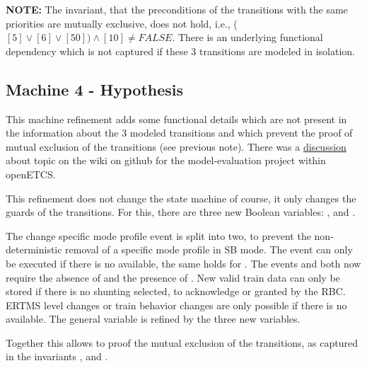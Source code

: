 \documentclass{template/openetcs_article}
\begin{document}
{\bf NOTE:} The invariant, that the preconditions of the transitions with the
same priorities are mutually exclusive, does not hold, i.e., ($[5] \vee [6] \vee
[50]) \wedge [10] \neq FALSE$. There is an underlying functional dependency
which is not captured if these 3 transitions are modeled in isolation.



\subsection{Machine 4 - Hypothesis}
\label{sec:machine-4-hypothesis}

This machine refinement adds some functional details which are not present in
the information about the 3 modeled transitions and which prevent the proof of
mutual exclusion of the transitions (see previous note). There was a
\href{https://github.com/openETCS/model-evaluation/wiki/Open-Question-for-Modeling-Benchmark}{discussion}
about topic on the wiki on github for the model-evaluation project within
openETCS.

This refinement does not change the state machine of course, it only changes the
guards of the transitions. For this, there are three new Boolean variables:
,  and .

The change specific mode profile event is split into two, to prevent the
non-deterministic removal of a specific mode profile in SB mode. The
 event can only be executed if there is no
 available, the same holds for
. The events 
and  both now require the absence of
 and the presence of . New valid
train data can only be stored if there is no shunting selected, to acknowledge
or granted by the RBC. ERTMS level changes or train behavior changes are only
possible if there is no  available. The general variable
 is refined by the three new variables.

Together this allows to proof the mutual exclusion of the transitions, as
captured in the invariants ,  and .


\end{document}
